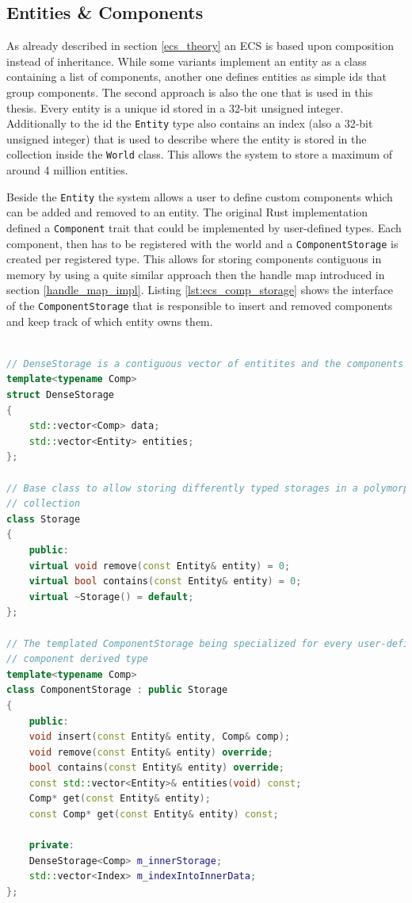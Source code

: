 \subsection{Entities \& Components}

As already described in section \ref{ecs_theory} an \ac{ECS} is based upon composition instead of inheritance. While some variants implement an entity as a class containing a list of components, another one defines entities as simple ids that group components. The second approach is also the one that is used in this thesis. Every entity is a unique id stored in a 32-bit unsigned integer. Additionally to the id the \texttt{Entity} type also contains an index (also a 32-bit unsigned integer) that is used to describe where the entity is stored in the collection inside the \texttt{World} class. This allows the system to store a maximum of around 4 million entities.

Beside the \texttt{Entity} the system allows a user to define custom components which can be added and removed to an entity. The original Rust implementation defined a \texttt{Component} trait that could be implemented by user-defined types. Each component, then has to be registered with the world and a \texttt{ComponentStorage} is created per registered type. This allows for storing components contiguous in memory by using a quite similar approach then the handle map introduced in section \ref{handle_map_impl}. Listing \ref{lst:ecs_comp_storage} shows the interface of the \texttt{ComponentStorage} that is responsible to insert and removed components and keep track of which entity owns them.\\

\begin{lstlisting}[caption={ComponentStorage interface of the C++ implementation}, label={lst:ecs_comp_storage}, language={C++}]

// DenseStorage is a contiguous vector of entitites and the components of type C
template<typename Comp>
struct DenseStorage
{
	std::vector<Comp> data;
	std::vector<Entity> entities;
};

// Base class to allow storing differently typed storages in a polymorphic 
// collection
class Storage
{
	public:
	virtual void remove(const Entity& entity) = 0;
	virtual bool contains(const Entity& entity) = 0;
	virtual ~Storage() = default;
};

// The templated ComponentStorage being specialized for every user-defined
// component derived type
template<typename Comp>
class ComponentStorage : public Storage
{
	public:
	void insert(const Entity& entity, Comp& comp);
	void remove(const Entity& entity) override;
	bool contains(const Entity& entity) override;
	const std::vector<Entity>& entities(void) const;
	Comp* get(const Entity& entity);
	const Comp* get(const Entity& entity) const;
	
	private:
	DenseStorage<Comp> m_innerStorage;
	std::vector<Index> m_indexIntoInnerData;
};
\end{lstlisting}

